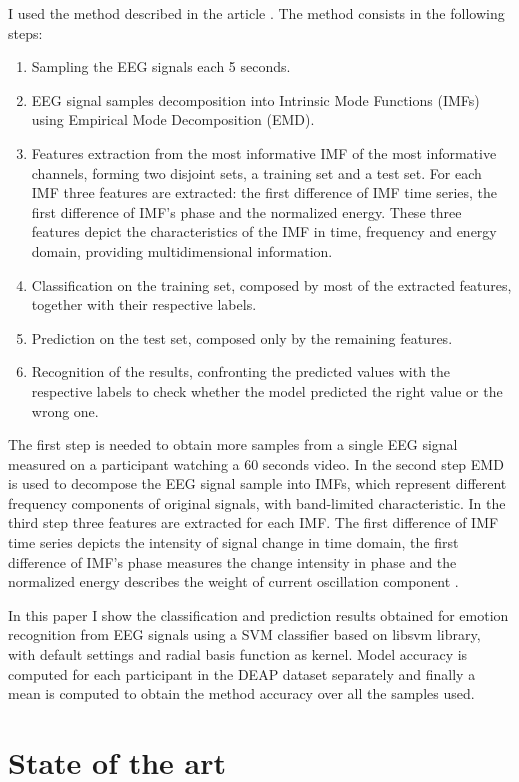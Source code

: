 \documentclass[10pt,journal,A4paper,compsoc,epsfig]{IEEEtran}
\begin{document}
I used the method described in the article \cite{zhuang2017emotion}. The method consists in the following steps:
\begin{enumerate}
\item Sampling the EEG signals each 5 seconds.
\item EEG signal samples decomposition into Intrinsic Mode Functions (IMFs) using Empirical Mode Decomposition (EMD).
\item Features extraction from the most informative IMF of the most informative channels, forming two disjoint sets, a training set and a test set. For each IMF three features are extracted: the first difference of IMF time series, the first difference of IMF's phase and the normalized energy. These three features depict the characteristics of the IMF in time, frequency and energy domain, providing multidimensional information.
\item Classification on the training set, composed by most of the extracted features, together with their respective labels.
\item Prediction on the test set, composed only by the remaining features.
\item Recognition of the results, confronting the predicted values with the respective labels to check whether the model predicted the right value or the wrong one.
\end{enumerate}

The first step is needed to obtain more samples from a single EEG signal measured on a participant watching a 60 seconds video. 
In the second step EMD is used to decompose the EEG signal sample into IMFs, which represent different frequency components of original signals, with band-limited characteristic.
In the third step three features are extracted for each IMF. The first difference of IMF time series depicts the intensity of signal change in time domain, the first difference of IMF's phase measures the change intensity in phase and the normalized energy describes the weight of current oscillation component \cite{zhuang2017emotion}.


In this paper I show the classification and prediction results obtained for emotion recognition from EEG signals using a SVM classifier based on libsvm library, with default settings and radial basis function as kernel. Model accuracy is computed for each participant in the DEAP dataset separately and finally a mean is computed to obtain the method accuracy over all the samples used.


\section{State of the art}
\label{back}
\end{document}
